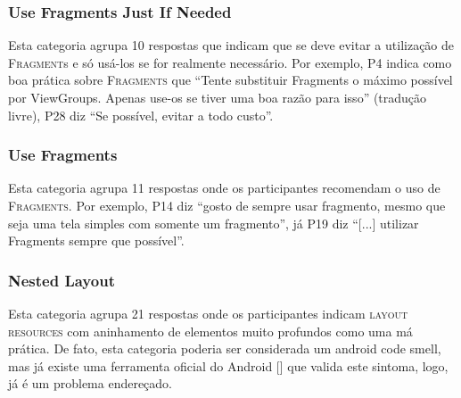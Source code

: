 

\subsubsection{Use Fragments Just If Needed} 
Esta categoria agrupa 10 respostas que indicam que se deve evitar a utiliza\c{c}\~ao de \textsc{Fragment}s e s\'o us\'a-los se for realmente necess\'ario. Por exemplo, P4 indica como boa pr\'atica sobre \textsc{Fragments} que ``Tente substituir Fragments o m\'aximo poss\'ivel por ViewGroups. Apenas use-os se tiver uma boa raz\~ao para isso'' (tradu\c{c}\~ao livre), P28 diz ``Se poss\'ivel, evitar a todo custo''. 

\subsubsection{Use Fragments} 
Esta categoria agrupa 11 respostas onde os participantes recomendam o uso de \textsc{Fragments}. Por exemplo, P14 diz ``gosto de sempre usar fragmento, mesmo que seja uma tela simples com somente um fragmento'', j\'a P19 diz ``[...] utilizar Fragments sempre que poss\'ivel''. 

\subsubsection{Nested Layout} 
Esta categoria agrupa 21 respostas onde os participantes indicam \textsc{layout resources} com aninhamento de elementos muito profundos como uma m\'a pr\'atica. De fato, esta categoria poderia ser considerada um android code smell, mas j\'a existe uma ferramenta oficial do Android [] que valida este sintoma, logo, j\'a \'e um problema endere\c{c}ado.



